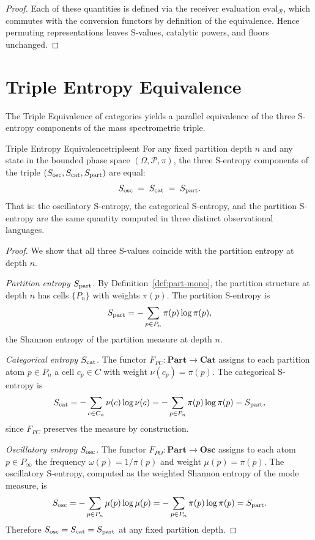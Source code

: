 \begin{proof}
Each of these quantities is defined via the receiver evaluation
$\mathrm{eval}_{\mathcal{R}}$, which commutes with the conversion functors by
definition of the equivalence.  Hence permuting representations leaves S-values,
catalytic powers, and floors unchanged.
\end{proof}

\section{Triple Entropy Equivalence}
\label{sec:ch15-entropy}

The Triple Equivalence of categories yields a parallel equivalence of the three
S-entropy components of the mass spectrometric triple.

\begin{consequence}{Triple Entropy Equivalence}{tripleent}
For any fixed partition depth $n$ and any state in the bounded phase space
$(\Omega, \mathscr{P}, \pi)$, the three S-entropy components of the triple
$(S_{\mathrm{osc}}, S_{\mathrm{cat}}, S_{\mathrm{part}})$ are equal:
\[
  S_{\mathrm{osc}} \;=\; S_{\mathrm{cat}} \;=\; S_{\mathrm{part}}.
\]
That is: the oscillatory S-entropy, the categorical S-entropy, and the
partition S-entropy are the same quantity computed in three distinct
observational languages.
\end{consequence}

\begin{proof}
We show that all three S-values coincide with the partition entropy at depth
$n$.

\medskip\noindent
\textit{Partition entropy $S_{\mathrm{part}}$.}
By Definition~\ref{def:part-mono}, the partition structure at depth $n$ has
cells $\{P_n\}$ with weights $\pi(p)$.  The partition S-entropy is
\[
  S_{\mathrm{part}} = -\sum_{p \in P_n} \pi(p)\log\pi(p),
\]
the Shannon entropy of the partition measure at depth $n$.

\medskip\noindent
\textit{Categorical entropy $S_{\mathrm{cat}}$.}
The functor $F_{PC} : \mathbf{Part} \to \mathbf{Cat}$ assigns to each
partition atom $p \in P_n$ a cell $c_p \in C$ with weight $\nu(c_p) = \pi(p)$.
The categorical S-entropy is
\[
  S_{\mathrm{cat}} = -\sum_{c \in C_n} \nu(c)\log\nu(c)
       = -\sum_{p \in P_n} \pi(p)\log\pi(p)
       = S_{\mathrm{part}},
\]
since $F_{PC}$ preserves the measure by construction.

\medskip\noindent
\textit{Oscillatory entropy $S_{\mathrm{osc}}$.}
The functor $F_{PO} : \mathbf{Part} \to \mathbf{Osc}$ assigns to each atom
$p \in P_\infty$ the frequency $\omega(p) = 1/\pi(p)$ and weight $\mu(p) =
\pi(p)$.  The oscillatory S-entropy, computed as the weighted Shannon entropy
of the mode measure, is
\[
  S_{\mathrm{osc}} = -\sum_{p \in P_n} \mu(p)\log\mu(p)
       = -\sum_{p \in P_n} \pi(p)\log\pi(p)
       = S_{\mathrm{part}}.
\]
Therefore $S_{\mathrm{osc}} = S_{\mathrm{cat}} = S_{\mathrm{part}}$ at any fixed partition depth.
\end{proof}

